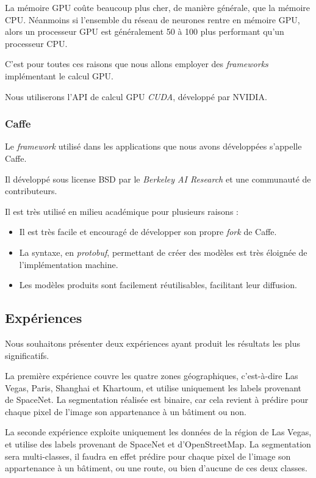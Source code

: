 \documentclass[a4paper, 11pt]{report}
\begin{document}
La mémoire GPU coûte beaucoup plus cher, de manière générale, que la mémoire CPU. Néanmoins si l'ensemble du réseau de neurones rentre en mémoire GPU, alors un processeur GPU est généralement 50 à 100 plus performant qu'un processeur CPU.

C'est pour toutes ces raisons que nous allons employer des \emph{frameworks} implémentant le calcul GPU.

Nous utiliserons l'API de calcul GPU \emph{CUDA}, développé par NVIDIA.

\subsubsection{Caffe}
Le \emph{framework} utilisé dans les applications que nous avons développées s'appelle Caffe.

Il développé sous license BSD par le \emph{Berkeley AI Research} et une communauté de contributeurs.

Il est très utilisé en milieu académique pour plusieurs raisons :
\begin{itemize}
	\item Il est très facile et encouragé de développer son propre \emph{fork} de Caffe.
	\item La syntaxe, en \emph{protobuf}, permettant de créer des modèles est très éloignée de l'implémentation machine.
	\item Les modèles produits sont facilement réutilisables, facilitant leur diffusion.
\end{itemize}
\subsection{Expériences}
Nous souhaitons présenter deux expériences ayant produit les résultats les plus significatifs.

La première expérience couvre les quatre zones géographiques, c'est-à-dire Las Vegas, Paris, Shanghai et Khartoum, et utilise uniquement les labels provenant de SpaceNet.
La segmentation réalisée est binaire, car cela revient à prédire pour chaque pixel de l'image son appartenance à un bâtiment ou non.

La seconde expérience exploite uniquement les données de la région de Las Vegas,  et utilise des labels provenant de SpaceNet et d'OpenStreetMap.
La segmentation sera multi-classes, il faudra en effet prédire pour chaque pixel de l'image son appartenance à un bâtiment, ou une route, ou bien d'aucune de ces deux classes.
\end{document}
